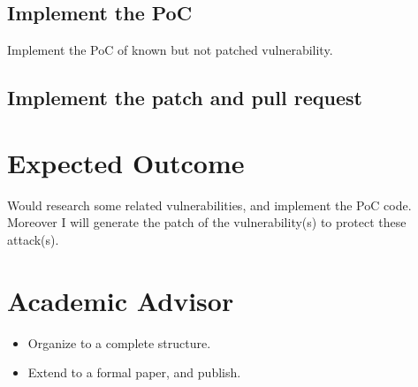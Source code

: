 \documentclass[12pt,a4paper,oneside,draft]{IEEEconf}
\begin{document}
\subsection{Implement the PoC}
Implement the PoC of known but not patched vulnerability.
\subsection{Implement the patch and pull request}

\section{Expected Outcome}
Would research some related vulnerabilities, and implement the PoC code.
Moreover I will generate the patch of the vulnerability(s) to protect these attack(s).

\printbibheading[heading=bibnumbered]
\printbibliography\newrefcontext

\section{Academic Advisor}
\begin{itemize}
  \item Organize to a complete structure.
  \item Extend to a formal paper, and publish.
\end{itemize}
\end{document}
